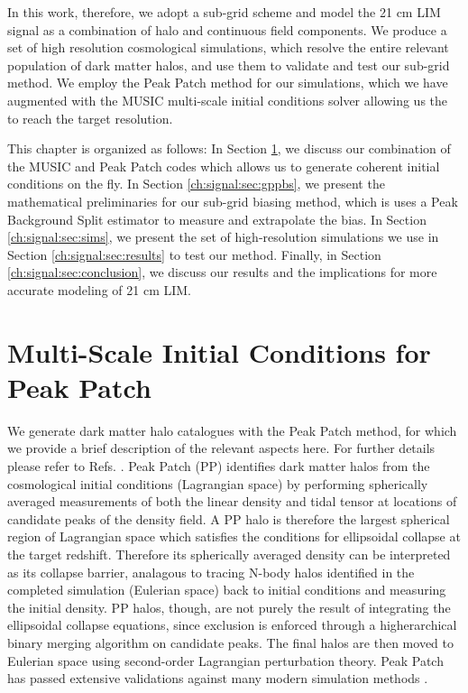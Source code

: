 In this work, therefore, we adopt a sub-grid scheme and model the 21 cm LIM signal as a combination of halo and continuous field components. We produce a set of high resolution cosmological simulations, which resolve the entire relevant population of dark matter halos, and use them to validate and test our sub-grid method. We employ the Peak Patch \citep{peakpatch1} method for our simulations, which we have augmented with the MUSIC multi-scale initial conditions solver allowing us the to reach the target resolution. 

This chapter is organized as follows: In Section \ref{ch:signal:sec:music}, we discuss our combination of the MUSIC and Peak Patch codes which allows us to generate coherent initial conditions on the fly. In Section \ref{ch:signal:sec:gppbs}, we present the mathematical preliminaries for our sub-grid biasing method, which is uses a Peak Background Split \citep{biasreview} estimator to measure and extrapolate the bias. In Section \ref{ch:signal:sec:sims}, we present the set of high-resolution simulations we use in Section \ref{ch:signal:sec:results} to test our method. Finally, in Section \ref{ch:signal:sec:conclusion}, we discuss our results and the implications for more accurate modeling of 21 cm LIM.

\section{Multi-Scale Initial Conditions for Peak Patch}
\label{ch:signal:sec:music}

We generate dark matter halo catalogues with the Peak Patch method, for which we provide a brief description of the relevant aspects here. For further details please refer to Refs. \citep{peakpatch,peakpatch2,peakpatch3}. Peak Patch (PP) identifies dark matter halos from the cosmological initial conditions (Lagrangian space) by performing spherically averaged measurements of both the linear density and tidal tensor at locations of candidate peaks of the density field. A PP halo is therefore the largest spherical region of Lagrangian space which satisfies the conditions for ellipsoidal collapse at the target redshift. Therefore its spherically averaged density can be interpreted as its collapse barrier, analagous to tracing N-body halos identified in the completed simulation (Eulerian space) back to initial conditions and measuring the initial density. PP halos, though, are not purely the result of integrating the ellipsoidal collapse equations, since exclusion is enforced through a higherarchical binary merging algorithm on candidate peaks. The final halos are then moved to Eulerian space using second-order Lagrangian perturbation theory. Peak Patch has passed extensive validations against many modern simulation methods \cite{euclidcp1, euclidcp2, euclidcp3}.

